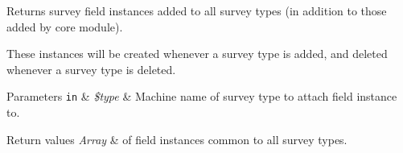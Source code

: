 Returns survey field instances added to all survey types (in addition to those added by core module).

These instances will be created whenever a survey type is added, and deleted whenever a survey type is deleted.


\begin{DoxyParams}[1]{Parameters}
\mbox{\tt in}  & {\em \$type} & Machine name of survey type to attach field instance to.\\
\hline
\end{DoxyParams}

\begin{DoxyRetVals}{Return values}
{\em Array} & of field instances common to all survey types. \\
\hline
\end{DoxyRetVals}
